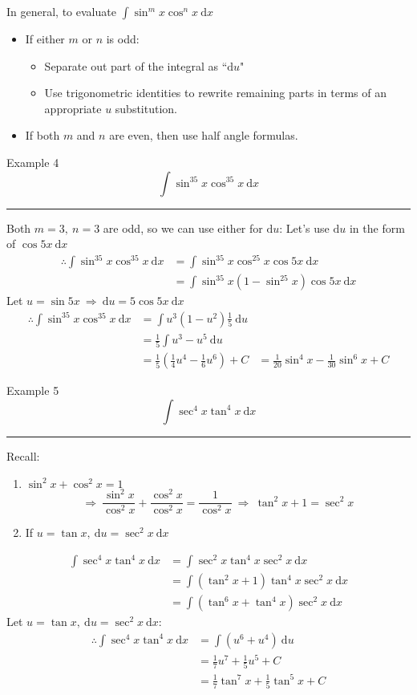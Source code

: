 \documentclass[12pt,a4paper]{article}
\def\d{{\mathrm{d}}}
\begin{document}
\begin{thm}{In general, to evaluate $\displaystyle\int\sin^mx\cos^nx\ \d x$}
	\begin{itemize}
		\item If either $m$ or $n$ is odd: 
		\begin{itemize}
			\item Separate out part of the integral as ``$\d u$"
			\item Use trigonometric identities to rewrite remaining parts in terms of an appropriate $u$ substitution.
		\end{itemize}
		\item If both $m$ and $n$ are even, then use half angle formulas. 
	\end{itemize}
\end{thm}
\begin{eg}{Example 4}
	$$\int\sin^35x\cos^35x\ \d x$$
	\noindent\rule[0.25\baselineskip]{\textwidth}{1pt}
	Both $m=3,\ n=3$ are odd, so we can use either for $\d u$: Let's use $\d u$ in the form of $\cos{5x}\ \d x$
	$$\begin{aligned}
		\therefore\int\sin^35x\cos^35x\ \d x&=\int\sin^35x\cos^25x\cos{5x}\ \d x\\
		&=\int\sin^35x(1-\sin^25x)\cos5x\ \d x
	\end{aligned}$$
	Let $u=\sin5x\ \Rightarrow\ \d u=5\cos5x\ \d x$
	$$\begin{aligned}
		\therefore\int\sin^35x\cos^35x\ \d x&=\int u^3\left(1-u^2\right)\frac{1}{5}\ \d u\\
		&=\frac{1}{5}\int u^3-u^5\ \d u\\
		&=\frac{1}{5}\left(\frac{1}{4}u^4-\frac{1}{6}u^6\right)+C
		&=\frac{1}{20}\sin^4x-\frac{1}{30}\sin^6x+C
	\end{aligned}$$
\end{eg}
\begin{eg}{Example 5}
	$$\int\sec^4x\tan^4x\ \d x$$
	\noindent\rule[0.25\baselineskip]{\textwidth}{1pt}
	\begin{tcolorbox}Recall: \begin{enumerate}
		\item $\sin^2x+\cos^2x=1$ $$\Rightarrow\ \frac{\sin^2x}{\cos^2x}+\frac{\cos^2x}{\cos^2x}=\frac{1}{\cos^2x}\ \Rightarrow\ \tan^2x+1=\sec^2x$$
		\item If $u=\tan{x},\ \d u=\sec^2x\ \d x$
	\end{enumerate}\end{tcolorbox}
	$$\begin{aligned}
		\int\sec^4x\tan^4x\ \d x&=\int\sec^2x\tan^4x\sec^2x\ \d x\\
		&=\int\left(\tan^2x+1\right)\tan^4x\sec^2x\ \d x\\
		&=\int\left(\tan^6x+\tan^4x\right)\sec^2x\ \d x
	\end{aligned}$$
	Let $u=\tan{x},\ \d u=\sec^2{x}\ \d x$: 
	$$\begin{aligned}
		\therefore\int\sec^4x\tan^4x\ \d x&=\int\left(u^6+u^4\right)\ \d u\\
		&=\frac{1}{7}u^7+\frac{1}{5}u^5+C\\
		&=\frac{1}{7}\tan^7x+\frac{1}{5}\tan^5x+C
	\end{aligned}$$
\end{eg}
\end{document}
